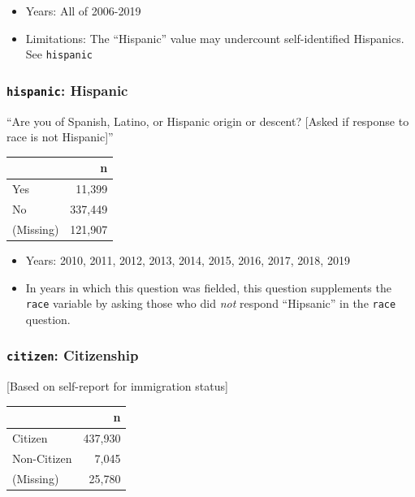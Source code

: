 \documentclass[10pt,article,oneside]{memoir}
\theoremstyle{definition}
\begin{document}
\begin{itemize}
\tightlist
\item
  Years: All of 2006-2019
\item
  Limitations: The ``Hispanic'' value may undercount self-identified
  Hispanics. See \texttt{hispanic}
\end{itemize}

\hypertarget{hispanic-hispanic}{%
\subsubsection{\texorpdfstring{\texttt{hispanic}:
Hispanic}{hispanic: Hispanic}}\label{hispanic-hispanic}}

``Are you of Spanish, Latino, or Hispanic origin or descent? {[}Asked if
response to race is not Hispanic{]}''

\begin{table}[H]
\centering
\begin{tabular}{lr}
\toprule
 & n\\
\midrule
Yes & 11,399\\
No & 337,449\\
(Missing) & 121,907\\
\bottomrule
\end{tabular}
\end{table}

\begin{itemize}
\tightlist
\item
  Years: 2010, 2011, 2012, 2013, 2014, 2015, 2016, 2017, 2018, 2019
\item
  In years in which this question was fielded, this question supplements
  the \texttt{race} variable by asking those who did \emph{not} respond
  ``Hipsanic'' in the \texttt{race} question.
\end{itemize}

\hypertarget{citizen-citizenship}{%
\subsubsection{\texorpdfstring{\texttt{citizen}:
Citizenship}{citizen: Citizenship}}\label{citizen-citizenship}}

{[}Based on self-report for immigration status{]}

\begin{table}[H]
\centering
\begin{tabular}{lr}
\toprule
 & n\\
\midrule
Citizen & 437,930\\
Non-Citizen & 7,045\\
(Missing) & 25,780\\
\bottomrule
\end{tabular}
\end{table}
\end{document}
